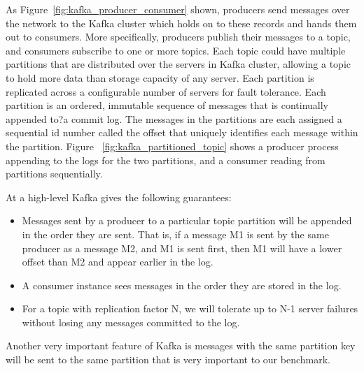 As Figure~\ref{fig:kafka_producer_consumer} shown, producers send messages over the network to the Kafka cluster which holds on to these records and hands them out to consumers. More specifically, producers publish their messages to a topic, and consumers subscribe to one or more topics. Each topic could have multiple partitions that are distributed over the servers in Kafka cluster, allowing a topic to hold more data than storage capacity of any server. Each partition is replicated across a configurable number of servers for fault tolerance. Each partition is an ordered, immutable sequence of messages that is continually appended to?a commit log. The messages in the partitions are each assigned a sequential id number called the offset that uniquely identifies each message within the partition.  Figure ~\ref{fig:kafka_partitioned_topic} shows a producer process appending to the logs for the two partitions, and a consumer reading from partitions sequentially. 

At a high-level Kafka gives the following guarantees: \cite{Kafka}
\begin{itemize}
  \item Messages sent by a producer to a particular topic partition will be appended in the order they are sent. That is, if a message M1 is sent by the same producer as a message M2, and M1 is sent first, then M1 will have a lower offset than M2 and appear earlier in the log. 
  \item A consumer instance sees messages in the order they are stored in the log.
  \item For a topic with replication factor N, we will tolerate up to N-1 server failures without losing any messages committed to the log.
\end{itemize}


Another very important feature of Kafka is messages with the same partition key will be sent to the same partition that is very important to our benchmark.


